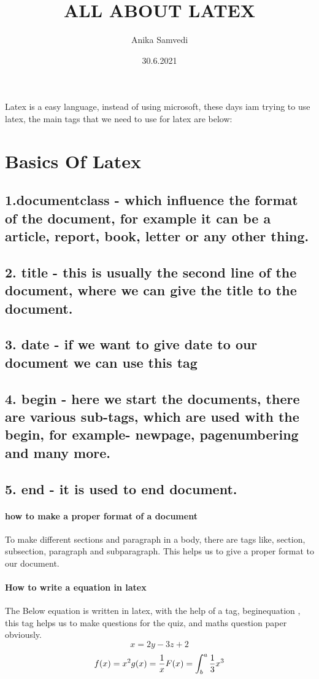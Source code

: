 \documentclass{book}
\title{ALL ABOUT LATEX}
\date{30.6.2021}
\author{Anika Samvedi}
\begin{document}
\maketitle
\newpage
{}
Latex is a easy language, instead of using microsoft, these days iam trying to use latex, the main tags that we need to use for latex are below:
\section{Basics Of Latex}
\subsection{1.documentclass - which influence the format of the document, for example it can be a article, report, book, letter or any other thing.}
\subsection{2. title - this is usually the second line of the document, where we can give the title to the document.}
\subsection{3. date - if we want to give date to our document we can use this tag}
\subsection{4. begin  - here we start the documents, there are various sub-tags, which are used with the begin, for example- newpage, pagenumbering and many more.}
\subsection{5. end - it is used to end document.}
\paragraph{how to make a proper format of a document}
To make different sections and paragraph in a body, there are tags like, section, subsection, paragraph and subparagraph. This helps us to give a proper format to our document.
\paragraph{How to write a equation in latex}
The Below equation is written in latex, with the help of a tag, beginequation , this tag helps us to make questions for the quiz, and maths question paper obviously.
\begin{equation}
x=2y-3z+2
\end{equation}
\begin{equation}
f(x) = x^2 \\
g(x) = \frac{1}{x}\\
 F(x) = \int^a_b\frac{1}{3}x^3
\end{equation}
\end{document}
